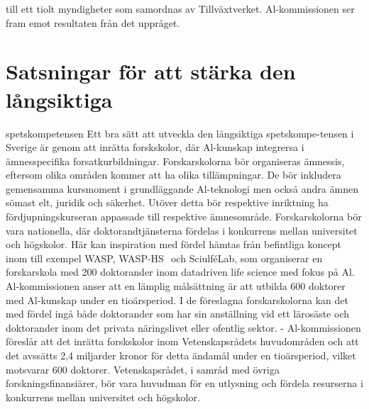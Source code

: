 {{{{{{{{till ett tiolt myndigheter som samordnas av Tillväxtverket. Al-kommissionen ser fram emot resultaten från det uppråget. \({ }^{}\)
\section*{Satsningar för att stärka den långsiktiga}
spetskompetensen
Ett bra sätt att utveckla den långsiktiga spetskompe-tensen i Sverige är genom att inrätta forskskolor, där Al-kunskap integrersa i ämnesspecifika forsatkurbildningar. Forskarskolorna bör organiseras ämnessis, eftersom olika områden kommer att ha olika tillämpningar. De bör inkludera gemensamma kursmoment i grundläggande Al-teknologi men också andra ämnen sömast elt, juridik och säkerhet. Utöver detta bör respektive inriktning ha fördjupningskurseran appassade till respektive ämnesområde.
Forskarskolorna bör vara nationella, där doktorandtjänsterna fördelas i konkurrens mellan universitet och högskolor. Här kan inspiration med fördel hämtas från befintliga koncept inom till exempel WASP, WASP-HS \({ }^{}\) och SciulféLab, som organiserar en forskarskola med 200 doktorander inom datadriven life science med fokus på Al. Al-kommissionen anser att en lämplig målsättning är att utbilda 600 doktorer med Al-kunskap under en tioärsperiod. I de föreslagna forskarskolorna kan det med fördel ingå både doktorander som har sin anställning vid ett lärosäste och doktorander inom det privata näringslivet eller ofentlig sektor.
- Al-kommissionen föreslår att det inrätta forskskolor inom Vetenskapsrådets huvudområden och att det avssätts 2,4 miljarder kronor för detta ändamål under en tioärsperiod, vilket motsvarar 600 doktorer. Vetenskapsrådet, i samråd med övriga forskningsfinansiärer, bör vara huvudman för en utlysning och fördela resurserna i konkurrens mellan universitet och högskolor.
}}}}}}}}
